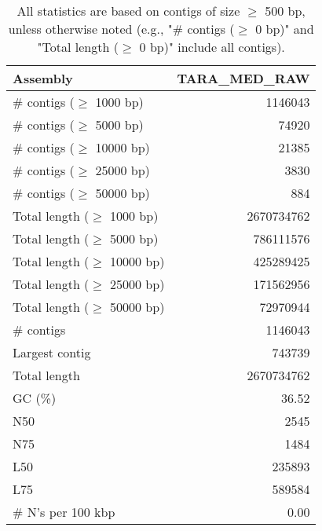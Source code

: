 \documentclass[12pt,a4paper]{article}
\begin{document}
\begin{table}[ht]
\begin{center}
\caption{All statistics are based on contigs of size $\geq$ 500 bp, unless otherwise noted (e.g., "\# contigs ($\geq$ 0 bp)" and "Total length ($\geq$ 0 bp)" include all contigs).}
\begin{tabular}{|l*{1}{|r}|}
\hline
Assembly & TARA\_MED\_RAW \\ \hline
\# contigs ($\geq$ 1000 bp) & 1146043 \\ \hline
\# contigs ($\geq$ 5000 bp) & 74920 \\ \hline
\# contigs ($\geq$ 10000 bp) & 21385 \\ \hline
\# contigs ($\geq$ 25000 bp) & 3830 \\ \hline
\# contigs ($\geq$ 50000 bp) & 884 \\ \hline
Total length ($\geq$ 1000 bp) & 2670734762 \\ \hline
Total length ($\geq$ 5000 bp) & 786111576 \\ \hline
Total length ($\geq$ 10000 bp) & 425289425 \\ \hline
Total length ($\geq$ 25000 bp) & 171562956 \\ \hline
Total length ($\geq$ 50000 bp) & 72970944 \\ \hline
\# contigs & 1146043 \\ \hline
Largest contig & 743739 \\ \hline
Total length & 2670734762 \\ \hline
GC (\%) & 36.52 \\ \hline
N50 & 2545 \\ \hline
N75 & 1484 \\ \hline
L50 & 235893 \\ \hline
L75 & 589584 \\ \hline
\# N's per 100 kbp & 0.00 \\ \hline
\end{tabular}
\end{center}
\end{table}
\end{document}
